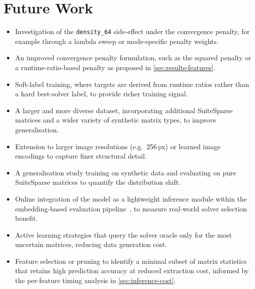 \section{Future Work}\label{sec:future-work}

\begin{itemize}
  \item Investigation of the \texttt{density\_64} side-effect under the convergence penalty,
        for example through a lambda sweep or mode-specific penalty weights.
  \item An improved convergence penalty formulation, such as the squared penalty or a
        runtime-ratio-based penalty as proposed in \autoref{sec:results-features}.
  \item Soft-label training, where targets are derived from runtime ratios rather than
        a hard best-solver label, to provide richer training signal.
  \item A larger and more diverse dataset, incorporating additional SuiteSparse matrices
        and a wider variety of synthetic matrix types, to improve generalisation.
  \item Extension to larger image resolutions (e.g.\ 256\,px) or learned image encodings
        to capture finer structural detail.
  \item A generalisation study training on synthetic data and evaluating on pure
        SuiteSparse matrices to quantify the distribution shift.
  \item Online integration of the model as a lightweight inference module within the
        embedding-based evaluation pipeline~\cite{weng2026embedding}, to measure real-world solver selection benefit.
  \item Active learning strategies that query the solver oracle only for the most
        uncertain matrices, reducing data generation cost.
  \item Feature selection or pruning to identify a minimal subset of matrix statistics
        that retains high prediction accuracy at reduced extraction cost, informed by the
        per-feature timing analysis in \autoref{sec:inference-cost}.
\end{itemize}
